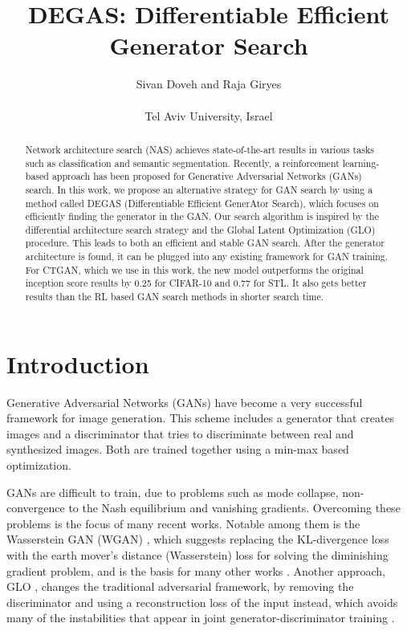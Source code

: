 \documentclass[10pt,twocolumn,letterpaper]{article}
\newcommand{\ourmethod}{DEGAS}
\begin{document}
\title{\ourmethod{}: Differentiable Efficient Generator Search }

\author{Sivan Doveh and 
Raja Giryes
\\ \\
Tel Aviv University, Israel}



\maketitle
\let\thefootnote\relax{}

\begin{abstract}
Network architecture search (NAS) achieves state-of-the-art results in various tasks such as classification and semantic segmentation. Recently, a reinforcement learning-based approach has been proposed for Generative Adversarial Networks (GANs) search.
In this work, we propose an alternative strategy for GAN search by using a method called DEGAS (Differentiable Efficient GenerAtor Search), which focuses on efficiently finding the generator in the GAN.  
Our search algorithm is inspired by the differential architecture search strategy and the Global Latent Optimization (GLO) procedure. This leads to both an efficient and stable GAN search. 
After the generator architecture is found, it can be plugged into any existing framework for GAN training. For CTGAN, which we use in this work, the new model outperforms the original inception score results by 0.25 for CIFAR-10 and 0.77 for STL. It also gets better results than the RL based GAN search methods in shorter search time.
\end{abstract}

\section{Introduction}
\label{Introduction}
Generative Adversarial Networks (GANs) \cite{gan} have become a very successful framework for image generation. This scheme includes a generator that creates images and a discriminator that tries to discriminate between real and synthesized images. Both are trained together using a min-max based optimization.  

GANs are difficult to train, due to problems such as mode collapse, non-convergence to the Nash equilibrium and vanishing gradients. Overcoming these problems is the focus of many recent works. Notable among them is the Wasserstein GAN (WGAN) \cite{wgan}, which suggests replacing the KL-divergence loss with the earth mover's distance (Wasserstein) loss for solving the diminishing gradient problem, and is the basis for many other works \cite{wgan-gp,ctagn,cagan}. Another approach, GLO \cite{glo}, changes the traditional adversarial framework, by removing the discriminator and using a reconstruction loss of the input instead, which avoids many of the instabilities that appear in joint generator-discriminator training \cite{Kurach19Large, IS}. 
\end{document}
